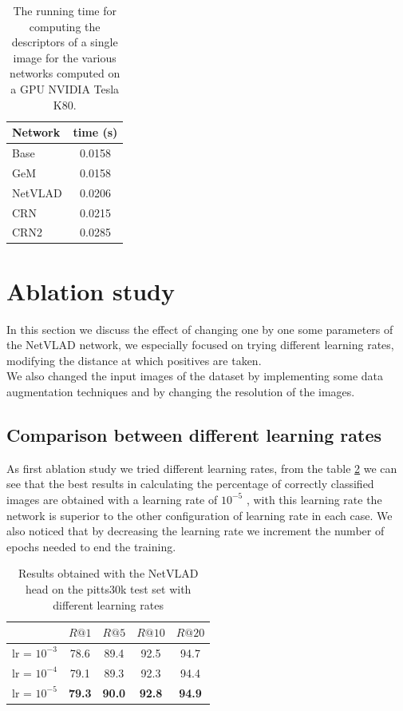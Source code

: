 \documentclass[10pt,twocolumn,letterpaper]{article}
\begin{document}
\begin{table}
   \centering
   \begin{tabular}{|l|c|}
      \hline
      Network     &  time (s)\\\hline
      Base	  &  0.0158\\
      GeM	  &  0.0158\\
      NetVLAD     &  0.0206\\
      CRN         &  0.0215\\
      CRN2        &  0.0285\\\hline
   \end{tabular}
   \caption{The running time for computing the descriptors of a single image for the various networks computed on a GPU NVIDIA Tesla K80.}
   \label{tab:time}
\end{table}

\section{Ablation study}
In this section we discuss the effect of changing one by one some parameters of the NetVLAD network, we especially focused on trying different learning rates, modifying the distance at which positives are taken.\\ We also changed the input images of the dataset by implementing some data augmentation techniques and by changing the resolution of the images.
\subsection{Comparison between different learning rates}
As first ablation study we tried different learning rates, from the table \ref{tab:NETVLAD:lr} we can see that the best results in calculating the percentage of correctly classified images are obtained with a learning rate of $10^{-5}$ , with this learning rate the network is superior to the other configuration of learning rate in each case. We also noticed that by decreasing the learning rate we increment the number of epochs needed to end the training.
\begin{table}[h]
	\centering
	\begin{tabular}{|l|c|c|c|c|}
		\hline
		&          $R@1$  &        $R@5$  &        $R@10$ &        $R@20$   \\ \hline     
		lr = $10^{-3}$ &         78.6    &    89.4       &    92.5       &         94.7       \\
		lr = $10^{-4}$ &         79.1    &         89.3  & 92.3 & 94.4  \\    
		lr = $10^{-5}$ & \textbf{79.3}   & \textbf{90.0} &         \textbf{92.8}  & \textbf{94.9}          \\
		\hline
	\end{tabular}
	\caption{Results obtained with the NetVLAD head on the pitts30k test set with different learning rates}
	\label{tab:NETVLAD:lr}
\end{table}
\end{document}
